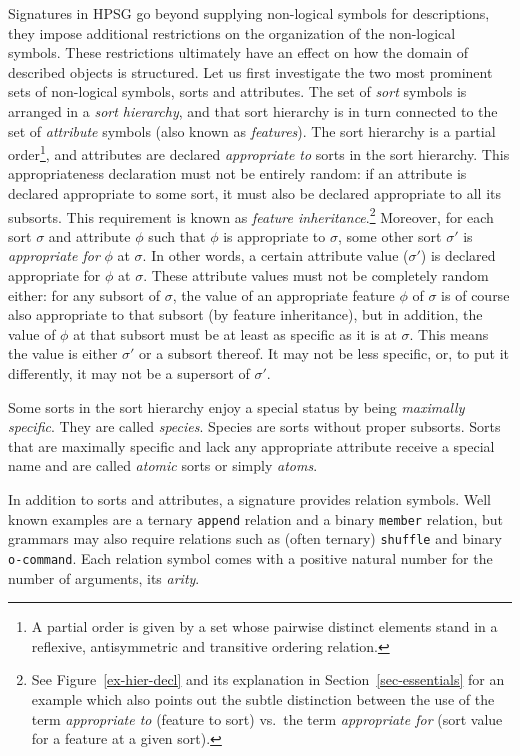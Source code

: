 \documentclass[output=paper
                ,modfonts
                ,nonflat
	        ,collection
	        ,collectionchapter
	        ,collectiontoclongg
 	        ,biblatex
                ,babelshorthands
                ,newtxmath
                ,draftmode
                ,colorlinks, citecolor=brown
]{./langsci/langscibook}
\begin{document}
{{Signatures in HPSG go beyond supplying non-logical symbols for
descriptions, they impose additional restrictions on the
organization of the non-logical symbols. These restrictions ultimately have an effect on
how the domain of described objects is structured. Let us first
investigate the two most prominent sets of non-logical symbols, sorts
and attributes. The set of \emph{sort} symbols is arranged in a
\emph{sort hierarchy}, and that sort hierarchy is in turn connected to
the set of \emph{attribute} symbols (also known as
\emph{features}). The sort hierarchy is a partial order\footnote{A partial order is given by a set whose pairwise distinct elements stand in a reflexive,
antisymmetric and transitive ordering relation.}, and
attributes are declared \emph{appropriate to} sorts
in the sort hierarchy. This appropriateness declaration must not be
entirely random: if an attribute is declared appropriate to some sort,
it must also be declared appropriate to all its subsorts. This requirement
is known as \emph{feature inheritance}.\footnote{See Figure~\ref{ex-hier-decl} and its explanation in Section~\ref{sec-essentials} for an example which also points out the subtle distinction between the use of the term \emph{appropriate to} (feature to sort) vs.\ the term \emph{appropriate for} (sort value for a feature at a given sort).}  Moreover, for each
sort $\sigma$ and attribute $\phi$ such that $\phi$ is appropriate to
$\sigma$, some other sort $\sigma'$ is \emph{appropriate for} $\phi$
at $\sigma$. In other words, a certain attribute value ($\sigma'$) is declared
appropriate for $\phi$ at $\sigma$. These attribute values must not be
completely random either: for any subsort of $\sigma$, the value of an
appropriate feature $\phi$ of $\sigma$ is of course also appropriate
to that subsort (by feature inheritance), but in addition, the value of $\phi$ at that subsort
must be at least as specific as it is at $\sigma$. This means the value is either
$\sigma'$ or a subsort thereof. It may not be less specific, or, to put
it differently, it may not be a
supersort of $\sigma'$.

Some sorts in the sort hierarchy enjoy a special status by being
\emph{maximally specific}. They are called \emph{species}. Species
are sorts without proper subsorts.
Sorts that are maximally specific and lack any appropriate attribute receive
a special name and are called \emph{atomic} sorts or simply \emph{atoms}.

In addition to sorts and attributes, a signature provides relation
symbols.  Well known examples are a ternary \texttt{append} relation
and a binary \texttt{member} relation, but grammars may also require
relations such as (often ternary) \texttt{shuffle} and binary
\texttt{o-command}. Each relation symbol comes with
a positive natural number for the number of arguments, its \emph{arity}.

}}
\end{document}
